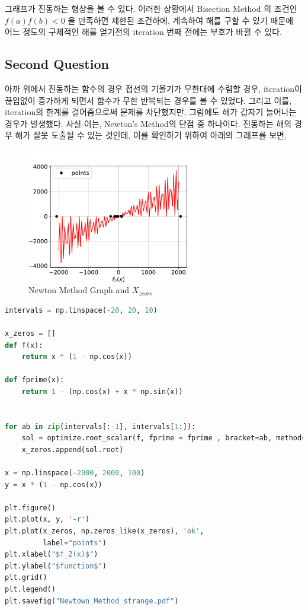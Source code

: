 \documentclass[11pt]{article}
\begin{document}
그래프가 진동하는 형상을 볼 수 있다. 이러한 상황에서 Bisection Method 의 조건인 $f(a)f(b) < 0 $ 을 만족하면 제한된 조건하에, 계속하여 해를 구할 수 있기 때문에 어느 정도의 구체적인 해를 얻기전의 iteration 번째 전에는 부호가 바뀔 수 있다.













\subsection{Second Question} 
아까 위에서 진동하는 함수의 경우 접선의 기울기가 무한대에 수렴할 경우, iteration이 끊임없이 증가하게 되면서 함수가 무한 반복되는 경우를 볼 수 있었다. 그리고 이를, iteration의 한계를 걸어줌으로써 문제를 차단했지만, 그럼에도 해가 갑자기 늘어나는 경우가 발생했다. 사실 이는, Newton's Method의 단점 중 하나이다. 진동하는 해의 경우 해가 잘못 도출될 수 있는 것인데, 이를 확인하기 위하여 아래의 그래프를 보면,
\begin{figure}[!ht]
  \centering
  \includegraphics[width=0.7\textwidth]{Newtown_Method_strange.pdf}
  \caption{Newton Method Graph and  $X_{zeors}$}
\end{figure}


\begin{lstlisting}[language=Python]
intervals = np.linspace(-20, 20, 10)

x_zeros = []
def f(x):
    return x * (1 - np.cos(x))

def fprime(x):
    return 1 - (np.cos(x) + x * np.sin(x))


for ab in zip(intervals[:-1], intervals[1:]):
    sol = optimize.root_scalar(f, fprime = fprime , bracket=ab, method='newton', x0 =ab[1])
    x_zeros.append(sol.root)

x = np.linspace(-2000, 2000, 100)
y = x * (1 - np.cos(x))

plt.figure()
plt.plot(x, y, '-r')
plt.plot(x_zeros, np.zeros_like(x_zeros), 'ok',
         label="points")
plt.xlabel("$f_2(x)$")
plt.ylabel("$function$")
plt.grid()
plt.legend()
plt.savefig("Newtown_Method_strange.pdf")
\end{lstlisting}
\end{document}
